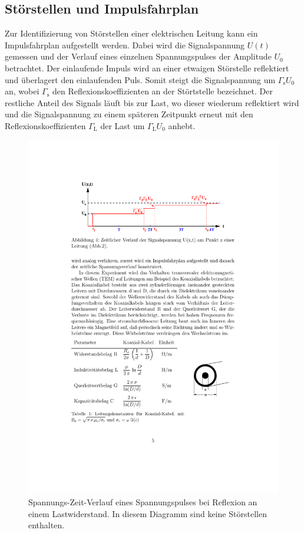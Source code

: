 \subsection{Störstellen und Impulsfahrplan} %
\label{sub:impulsfahrplan}
Zur Identifizierung von Störstellen einer elektrischen Leitung kann ein
Impulsfahrplan aufgestellt werden.
Dabei wird die Signalspannung $U(t)$ gemessen und der Verlauf eines einzelnen
Spannungspulses der Amplitude $U_0$ betrachtet.
Der einlaufende Impuls wird an einer etwaigen Störstelle reflektiert und
überlagert den einlaufenden Puls. Somit steigt die Signalspannung um
$\Gamma_\text{s}U_0$ an, wobei $\Gamma_\text{s}$ den Reflexionskoeffizienten
an der Störtstelle bezeichnet.
Der restliche Anteil des Signals läuft bis zur Last, wo dieser wiederum
reflektiert wird und die Signalspannung zu einem späteren Zeitpunkt erneut
mit den Reflexionskoeffizienten $\Gamma_\text{L}$ der Last um $\Gamma_\text{L}
U_0$ anhebt.
\begin{figure}[b]
    \center
    \includegraphics[width=0.9\linewidth]{img/spannung-zeit.pdf}
    \caption{
        Spannungs-Zeit-Verlauf eines Spannungspulses bei Reflexion an einem
        Lastwiderstand.
        In diesem Diagramm sind keine Störstellen enthalten.
    }
    \label{fig:spannung-zeit}
\end{figure}
